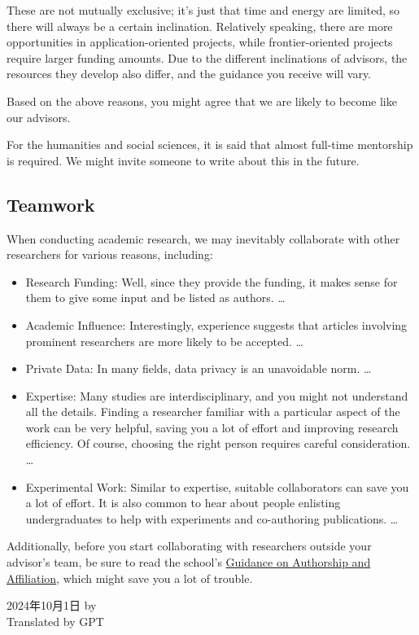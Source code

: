 These are not mutually exclusive; it’s just that time and energy are limited, so there will always be a certain inclination. Relatively speaking, there are more opportunities in application-oriented projects, while frontier-oriented projects require larger funding amounts. Due to the different inclinations of advisors, the resources they develop also differ, and the guidance you receive will vary.

Based on the above reasons, you might agree that we are likely to become like our advisors.

For the humanities and social sciences, it is said that almost full-time mentorship is required. We might invite someone to write about this in the future.

\subsection{Teamwork}
\label{subsection.teamwork}
When conducting academic research, we may inevitably collaborate with other researchers for various reasons, including:
\begin{itemize}
    \item Research Funding: Well, since they provide the funding, it makes sense for them to give some input and be listed as authors. \dots
    \item Academic Influence: Interestingly, experience suggests that articles involving prominent researchers are more likely to be accepted. \dots
    \item Private Data: In many fields, data privacy is an unavoidable norm. \dots
    \item Expertise: Many studies are interdisciplinary, and you might not understand all the details. Finding a researcher familiar with a particular aspect of the work can be very helpful, saving you a lot of effort and improving research efficiency. Of course, choosing the right person requires careful consideration. \dots
    \item Experimental Work: Similar to expertise, suitable collaborators can save you a lot of effort. It is also common to hear about people enlisting undergraduates to help with experiments and co-authoring publications. \dots
\end{itemize}

\vspace{\baselineskip}

Additionally, before you start collaborating with researchers outside your advisor’s team, be sure to read the school’s \href{https://ebridge.xjtlu.edu.cn/urd/sits.urd/run/SIW_FILE_LOAD.start_url?08F2CBCAE3174A7365Px9_5kBfG0_iGiWj8zb7ybwaO0YBYc8NiKlPG93xyQA9X2SClXOLLd7-_EgF50aijROwT-rdSGIUIbRRzhFu-76Ha0g2HymUr0S-Fgjm1DXP9RO1GhGzx5-akgsDSMBlNhR7vpib85F9vlqa67My7RKHFSiluZueFy52YCBtintt0wDTKmx4fCjkWnldNDaxo6ZVD2L572Us3V-FOv485wYZUNUn5NLzgR0pAaU7aiKnTVJY8Aa2su5F4u7o-rNPJPety3jwwJ4O1v1agpDZLZ1it1H5fWn3IgLNaWlUh84YpxNRXyTW1kIwrX0r4-dT1eoxdZUAFrJhaBwz6E0w}{Guidance on Authorship and Affiliation}, which might save you a lot of trouble.

\begin{flushright}
    2024年10月1日 by \Shiyao \\
    Translated by GPT
\end{flushright}